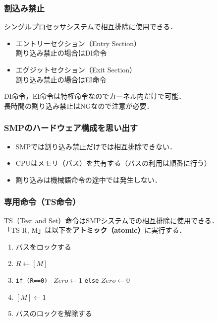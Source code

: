 \documentclass[unicode,handout]{beamer}                   %
\begin{document}
\begin{frame}
  \frametitle{割込み禁止}
  シングルプロセッサシステムで相互排除に使用できる．
  \begin{itemize}
  \item エントリーセクション（Entry Section）\\
    割り込み禁止の場合はDI命令
  \item エグジットセクション（Exit Section）\\
    割り込み禁止の場合はEI命令
  \end{itemize}
  \vfill
  DI命令，EI命令は特権命令なのでカーネル内だけで可能．\\
  長時間の割り込み禁止はNGなので注意が必要．
  \vfill
\end{frame}

\begin{frame}
  \frametitle{SMPのハードウェア構成を思い出す}
  \begin{itemize}
    \item SMPでは割り込み禁止だけでは相互排除できない．
    \item CPUはメモリ（バス）を共有する（バスの利用は順番に行う）
    \item 割り込みは機械語命令の途中では発生しない．
  \end{itemize}
  \vfill
\end{frame}

\begin{frame}
  \frametitle{専用命令（TS命令）}
  TS（Test and Set）命令はSMPシステムでの相互排除に使用できる．\\
  「TS  R, M」は以下を{\bf アトミック（atomic）}に実行する．
  \begin{enumerate}
  \item[1.] バスをロックする
  \item[2.] $R \leftarrow [M]$
  \item[3.] {\tt if (R==0) } $Zero \leftarrow 1$ {\tt else} $Zero \leftarrow 0$
  \item[4.] $[M] \leftarrow 1$
  \item[5.] バスのロックを解除する
  \end{enumerate}
  \vfill
\end{frame}
\end{document}
